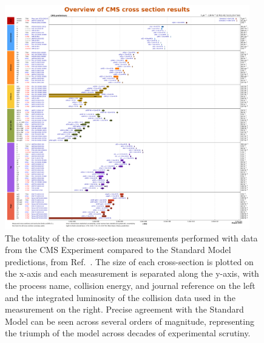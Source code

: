 \begin{figure}[htb]
    \centering
    \includegraphics[width=0.95\textwidth]{fig/cms/cms_xsecs_2023.pdf}
    \caption[The totality of the cross-section measurements performed with data from the CMS Experiment]{
        The totality of the cross-section measurements performed with data from the CMS Experiment compared to the Standard Model predictions, from Ref.~\cite{CMSXSecs}. 
        The size of each cross-section is plotted on the x-axis and each measurement is separated along the y-axis, with the process name, collision energy, and journal reference on the left and the integrated luminosity of the collision data used in the measurement on the right. 
        Precise agreement with the Standard Model can be seen across several orders of magnitude, representing the triumph of the model across decades of experimental scrutiny. 
    }
    \label{fig:cms_xsecs}
\end{figure}

